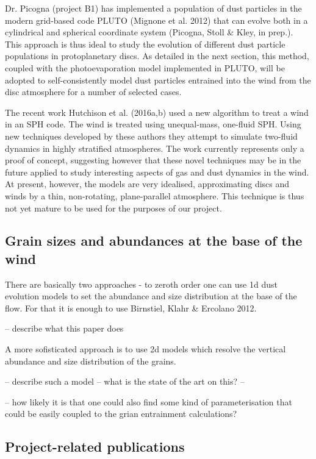 \documentclass[10pt,fleqn,twoside]{article}
\newcommand{\Tcol}{\color{blue}}
\begin{document}
Dr. Picogna (project B1) has implemented a population of dust
particles in the modern grid-based code PLUTO (Mignone et al. 2012)
that can evolve both in a cylindrical and spherical coordinate system
(Picogna, Stoll \& Kley, in prep.). This approach is thus ideal to
study the evolution of different dust particle populations in
protoplanetary discs. As detailed in the next section, this method,
coupled with the photoevaporation model implemented in PLUTO, will be
adopted to self-consistently model dust particles entrained into the
wind from the disc atmosphere for a number of selected cases.

The recent work Hutchison et al. (2016a,b) used a new algorithm to
treat a wind in an SPH code. The wind is
treated using unequal-mass, one-fluid SPH. Using new techniques
developed by these authors they attempt to simulate two-fluid dynamics
in highly stratified atmospheres. The work currently represents 
only a proof of concept, suggesting however that these novel
techniques may be in 
the future applied to study interesting aspects of gas and dust
dynamics in the wind. At present, however, the models are very
idealised, approximating discs and winds by a thin, non-rotating,
plane-parallel atmosphere.  This technique is thus not yet mature to
be used for the purposes of our project.

\subsection*{Grain sizes and abundances at the base of the wind}

{\color{green}There are basically two approaches - to zeroth order one
  can use 1d dust evolution models to set the abundance and size
  distribution at the base of the flow. For that it is enough to use
  Birnstiel, Klahr \& Ercolano 2012. 

-- describe what this paper does 

A more sofisticated approach is to use 2d models which resolve the
vertical abundance and size distribution of the grains. 

-- describe such a model -- what is the state of the art on this? -- 

-- how likely it is that one could also find some kind of
parameterisation that could be easily coupled to the grian entrainment calculations?
}


\subsection{\Tcol Project-related publications}
\end{document}
